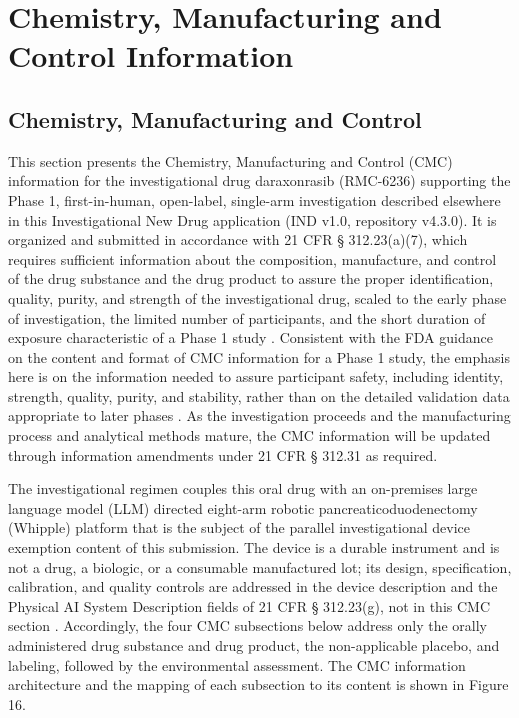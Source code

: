 \section{Chemistry, Manufacturing and Control Information}

\subsection{Chemistry, Manufacturing and Control}

This section presents the Chemistry, Manufacturing and Control (CMC)
information for the investigational drug daraxonrasib (RMC-6236) supporting the
Phase 1, first-in-human, open-label, single-arm investigation described
elsewhere in this Investigational New Drug application (IND v1.0, repository
v4.3.0). It is organized and submitted in accordance with 21 CFR \S
312.23(a)(7), which requires sufficient information about the composition,
manufacture, and control of the drug substance and the drug product to assure
the proper identification, quality, purity, and strength of the investigational
drug, scaled to the early phase of investigation, the limited number of
participants, and the short duration of exposure characteristic of a Phase 1
study \cite{phase1guidance}. Consistent with the FDA guidance on the content
and format of CMC information for a Phase 1 study, the emphasis here is on the
information needed to assure participant safety, including identity, strength,
quality, purity, and stability, rather than on the detailed validation data
appropriate to later phases \cite{phase1guidance}. As the investigation
proceeds and the manufacturing process and analytical methods mature, the CMC
information will be updated through information amendments under 21 CFR \S
312.31 as required.

The investigational regimen couples this oral drug with an on-premises large
language model (LLM) directed eight-arm robotic pancreaticoduodenectomy
(Whipple) platform that is the subject of the parallel investigational device
exemption content of this submission. The device is a durable instrument and is
not a drug, a biologic, or a consumable manufactured lot; its design,
specification, calibration, and quality controls are addressed in the device
description and the Physical AI System Description fields of 21 CFR \S
312.23(g), not in this CMC section
\cite{daraxwhipple,onpremwhippl}. Accordingly, the four CMC subsections below
address only the orally administered drug substance and drug product, the
non-applicable placebo, and labeling, followed by the environmental assessment.
The CMC information architecture and the mapping of each subsection to its
content is shown in Figure 16.

